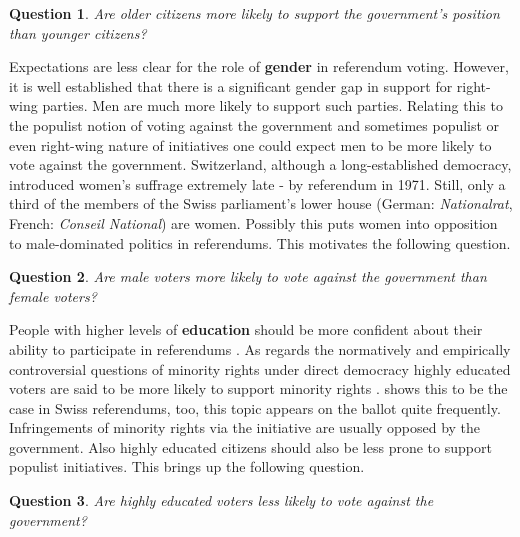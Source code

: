 \documentclass[11pt,a4paper]{article}\usepackage[]{graphicx}\usepackage[]{color}
\newtheorem{question}{Question}
\begin{document}
     \begin{question}
      \begin{minipage}[t]{4 in}
    	Are older citizens more likely to support the government's position than younger citizens?
      \end{minipage}
     \end{question}
    
    Expectations are less clear for the role of \textbf{gender} in referendum voting.  However, it is well established that there is a significant gender gap in support for right-wing parties. Men are much more likely to support such parties. Relating this to the populist notion of voting against the government and sometimes populist or even right-wing nature of initiatives one could expect men to be more likely to vote against the government. Switzerland, although a long-established democracy, introduced women's suffrage extremely late - by referendum in 1971. Still, only a third of the members of the Swiss parliament's lower house (German: \textit{Nationalrat}, French: \textit{Conseil National}) are women. Possibly this puts women into opposition to male-dominated politics in referendums. This motivates the following question.
    
    \begin{question}
      \begin{minipage}[t]{4 in}
	    Are male voters more likely to vote against the government than female voters?
      \end{minipage}
    \end{question}
    
    
    People with higher levels of \textbf{education} should be more confident about their ability to participate in referendums \citep{collingwood_levels_2012}. 
    As regards the normatively and empirically controversial questions of minority rights under direct democracy highly educated voters are said to be more likely to support minority rights \citep{bowler_demanding_1998,anderson_why_2010}. \citep{vatter_who_2014} shows this to be the case in Swiss referendums, too, this topic appears on the ballot quite frequently. Infringements of minority rights via the initiative are usually opposed by the government. Also highly educated citizens should also be less prone to support populist initiatives. This brings up the following question. 
    
     \begin{question}
     	\begin{minipage}[t]{4 in}
    	Are highly educated voters less likely to vote against the government?
    	\end{minipage}
     \end{question}
    
\end{document}
